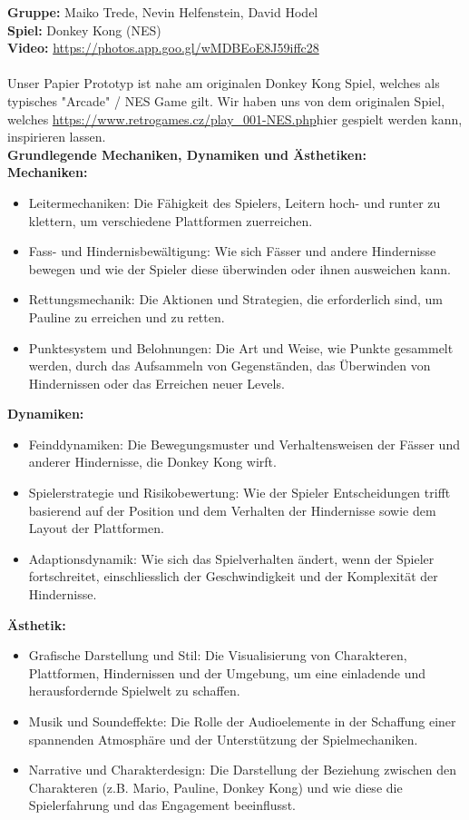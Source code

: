 \documentclass{article}
\begin{document}
\textbf{Gruppe:} Maiko Trede, Nevin Helfenstein, David Hodel
\\
\textbf{Spiel:} Donkey Kong (NES)
\\
\textbf{Video:} \url{https://photos.app.goo.gl/wMDBEoE8J59iffc28}
\\ \\
Unser Papier Prototyp ist nahe am originalen Donkey Kong Spiel, welches als typisches "Arcade" / NES Game gilt.
Wir haben uns von dem originalen Spiel, welches \url{https://www.retrogames.cz/play_001-NES.php}{hier} gespielt werden kann,
inspirieren lassen.
\\
\textbf{Grundlegende Mechaniken, Dynamiken und Ästhetiken:}
\\
\textbf{Mechaniken:}
\begin{itemize}
    \item Leitermechaniken: Die Fähigkeit des Spielers, Leitern hoch- und runter zu klettern, um verschiedene Plattformen zuerreichen.
    \item Fass- und Hindernisbewältigung: Wie sich Fässer und andere Hindernisse bewegen und wie der Spieler diese überwinden
    oder ihnen ausweichen kann.
    \item Rettungsmechanik: Die Aktionen und Strategien, die erforderlich sind, um Pauline zu erreichen und zu retten.
    \item Punktesystem und Belohnungen: Die Art und Weise, wie Punkte gesammelt werden, durch das Aufsammeln von Gegenständen,
    das Überwinden von Hindernissen oder das Erreichen neuer Levels.
\end{itemize}
\bigskip
\textbf{Dynamiken:}
\begin{itemize}
    \item Feinddynamiken: Die Bewegungsmuster und Verhaltensweisen der Fässer und anderer Hindernisse, die Donkey Kong wirft.
    \item Spielerstrategie und Risikobewertung: Wie der Spieler Entscheidungen trifft basierend auf der Position und dem Verhalten
    der Hindernisse sowie dem Layout der Plattformen.
    \item Adaptionsdynamik: Wie sich das Spielverhalten ändert, wenn der Spieler fortschreitet, einschliesslich der Geschwindigkeit
    und der Komplexität der Hindernisse.
\end{itemize}
\bigskip
\textbf{Ästhetik:}
\begin{itemize}
    \item Grafische Darstellung und Stil: Die Visualisierung von Charakteren, Plattformen, Hindernissen und der Umgebung, um eine
    einladende und herausfordernde Spielwelt zu schaffen.
    \item Musik und Soundeffekte: Die Rolle der Audioelemente in der Schaffung einer spannenden Atmosphäre und der Unterstützung
    der Spielmechaniken.
    \item Narrative und Charakterdesign: Die Darstellung der Beziehung zwischen den Charakteren (z.B. Mario, Pauline, Donkey Kong)
    und wie diese die Spielerfahrung und das Engagement beeinflusst.
\end{itemize}
\end{document}
